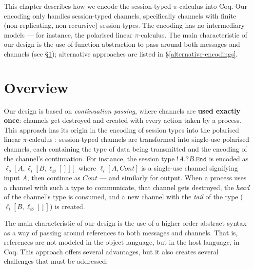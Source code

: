 \documentclass{mproj}
\newcommand{\picalc}{$\pi$-calculus}
\newcommand{\type}{\texttt}
\newcommand{\End}{\type{End}}
\newcommand{\Send}[1]{!#1.}
\newcommand{\Recv}[1]{?#1.}
\renewcommand{\emptyset}{\varnothing}
\begin{document}
This chapter describes how we encode the session-typed \picalc{} into Coq. Our encoding only handles session-typed channels, specifically channels with finite (non-replicating, non-recursive) session types. The encoding has no intermediary models --- for instance, the polarised linear \picalc{}. The main characteristic of our design is the use of function abstraction to pass around both messages and channels (see \S \ref{overview}); alternative approaches are listed in \S \ref{alternative-encodings}. 

\section{Overview}\label{overview}

Our design is based on \emph{continuation passing}, where channels are \textbf{used exactly once}: channels get destroyed and created with every action taken by a process. This approach has its origin in the encoding of session types into the polarised linear \picalc{} \cite{Dardha2016, otherwork}: session-typed channels are transformed into single-use polarised channels, each containing the type of data being transmitted and the encoding of the channel's continuation. For instance, the session type $\Send{A} \Recv{B} \End$ is encoded as $\ell_o [A,\ell_i [B,\ell_\emptyset []]]$ where $\ell_i [A, Cont]$ is a single-use channel signifying input $A$, then continue as $Cont$ --- and similarly for output. When a process uses a channel with such a type to communicate, that channel gets destroyed, the \emph{head} of the channel's type is consumed, and a new channel with the \emph{tail} of the type ($\ell_i [B, \ell_\emptyset []]$) is created.

The main characteristic of our design is the use of a higher order abstract syntax as a way of passing around references to both messages and channels. That is, references are not modeled in the object language, but in the host language, in Coq. This approach offers several advantages, but it also creates several challenges that must be addressed:

\end{document}
